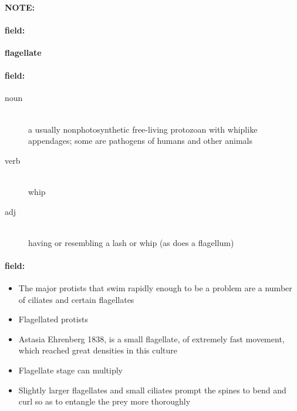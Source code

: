 \documentclass[12pt]{article}
\newenvironment{note}{\paragraph{NOTE:}}{}
\newenvironment{field}{\paragraph{field:}}{}
\begin{document}
\begin{note}
\begin{field}
\textbf{\large flagellate}
\end{field}


\begin{field}
\begin{description}
\item[noun] \hfill \\ 
a usually nonphotosynthetic free-living protozoan with whiplike appendages; some are pathogens of humans and other animals

\item[verb] \hfill \\ 
whip

\item[adj] \hfill \\ 
having or resembling a lash or whip (as does a flagellum)

\end{description}
\end{field}

\begin{field}
\begin{itemize}
\item The major protists that swim rapidly enough to be a problem are a number of ciliates and certain flagellates
\item Flagellated protists
\item Astasia Ehrenberg 1838, is a small flagellate, of extremely fast movement, which reached great densities in this culture
\item Flagellate stage can multiply
\item Slightly larger flagellates and small ciliates prompt the spines to bend and curl so as to entangle the prey more thoroughly
\end{itemize}
\end{field}
\end{note}
\end{document}
